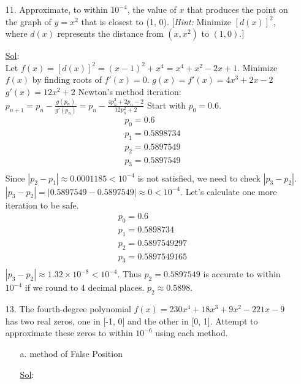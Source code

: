 \begin{enumerate}
  \item[11.] Approximate, to within \( 10^{-4} \), the value of \( x
    \) that produces the point on the graph of \( y = x^2 \) that is
    closest to (1, 0). [\textit{Hint:} Minimize \([d(x)]^2\), where
    \(d(x)\) represents the distance from \( (x, x^2)\) to \( (1, 0) \).]

    \underline{Sol}:\\
    Let \( f(x) = [d(x)]^2 = (x - 1)^2 + x^4 = x^4 + x^2 - 2x + 1 \).
    Minimize \( f(x) \) by finding roots of \( f'(x) = 0 \).
    \( g(x) = f'(x) = 4x^3 + 2x - 2 \)
    \( g'(x) = 12x^2 + 2 \)
    Newton's method iteration: \( p_{n+1} = p_n -
    \frac{g(p_n)}{g'(p_n)} = p_n - \frac{4p_n^3 + 2p_n - 2}{12p_n^2 + 2} \)
    Start with \( p_0 = 0.6 \).
    \[
      \begin{array}{l}
        p_0 = 0.6 \\
        p_1 = 0.5898734 \\
        p_2 = 0.5897549 \\
        p_3 = 0.5897549 \\
      \end{array}
    \]
    Since \( |p_2 - p_1| \approx 0.0001185 < 10^{-4} \) is not
    satisfied, we need to check \( |p_3 - p_2| \).
    \( |p_3 - p_2| = |0.5897549 - 0.5897549| \approx 0 < 10^{-4} \).
    Let's calculate one more iteration to be safe.
    \[
      \begin{array}{l}
        p_0 = 0.6 \\
        p_1 = 0.5898734 \\
        p_2 = 0.5897549297 \\
        p_3 = 0.5897549165 \\
      \end{array}
    \]
    \( |p_3 - p_2| \approx 1.32 \times 10^{-8} < 10^{-4} \).
    Thus \( p_2 = 0.5897549 \) is accurate to within \( 10^{-4} \) if
    we round to 4 decimal places. \( p_2 \approx 0.5898 \).


  \item[13.] The fourth-degree polynomial \( f(x) = 230x^4 + 18x^3 +
    9x^2 - 221x -9 \) has two real zeros, one in [-1, 0] and the
    other in [0, 1]. Attempt to approximate these zeros to within \(
    10^{-6} \) using each method.
    \begin{enumerate}
      \item[a.] method of False Position

        \underline{Sol}:\\


\end{enumerate}
\end{enumerate}
